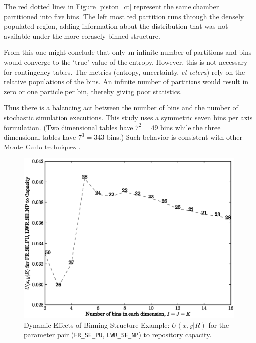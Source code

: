 The red dotted lines in Figure \ref{piston_ct} represent the same chamber partitioned into 
five bins.  The left most red partition runs through the
densely populated region, adding information about the distribution that was not available 
under the more corasely-binned structure.

From this one might conclude that only an infinite number of partitions and bins would converge 
to the `true' value of the entropy.  However, this is not necessary for contingency tables.  
The metrics (entropy, uncertainty, \emph{et cetera}) rely on the relative populations of the bins.
An infinite number of partitions would result in zero or one particle per bin, thereby 
giving poor statistics.

Thus there is a balancing act between the number of bins and the number of stochastic 
simulation executions.  This study uses a symmetric seven bins per axis formulation.  
(Two dimensional tables have $7^2=49$ bins while the three dimensional tables have
$7^3=343$ bins.)
Such behavior is consistent with other Monte Carlo techniques \cite{Press2007}.

\begin{figure}[htbp]
\begin{center}
\includegraphics[scale=0.70]{ct_sensitivity/figs/U_xy_R_for_FR_SE_PU_and_LWR_SE_NP_to_Capacity_rank.eps}
\caption{Dynamic Effects of Binning Structure Example: $U(x,y|R)$ for the parameter pair (\texttt{FR\_SE\_PU}, \texttt{LWR\_SE\_NP}) to repository capacity.}
\label{dynamic_effects}
\end{center}
\end{figure}


